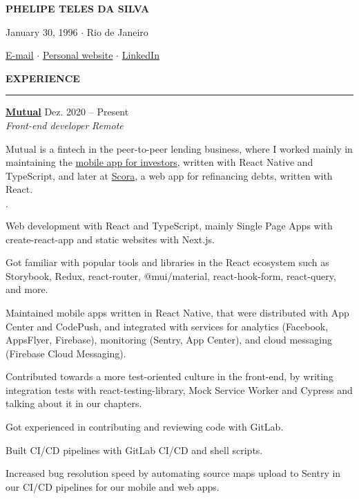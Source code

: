 \documentclass[12pt,letterpaper]{article}
\newenvironment{tightlist}
  {\begin{list}
    {$\cdot$}
    {
      \setlength{\leftmargin}{0em}
      \setlength{\itemsep}{-\smallskipamount}
    }
  }
{\end{list}}
\begin{document}
\pagestyle{empty}

\centerline{\huge\bf PHELIPE TELES DA SILVA}
\medskip

\centerline{January 30, 1996 $\cdot$ Rio de Janeiro}
\smallskip

\centerline{
  \href{mailto:telesphelipe@gmail.com}{E-mail}
  $\cdot$
  \href{https://phelipetls.github.io}{Personal website}
  $\cdot$
  \href{https://linkedin.com/in/phelipeteles}{LinkedIn}
}
\smallskip

\medskip \textbf{EXPERIENCE} \medskip
\hrule

\textbf{\href{https://mutual.club}{Mutual}} \hfill Dez. 2020 -- Present \\
\emph{Front-end developer} \hfill \emph{Remote} {\parfillskip=0pt\par}

Mutual is a fintech in the peer-to-peer lending business, where I worked mainly
in maintaining the \href{https://mutual.club/en/invest.html}{mobile app for
investors}, written with React Native and TypeScript, and later at
\href{https://scora.com.br/}{Scora}, a web app for refinancing debts, written
with React.

\medskip

\begin{tightlist}
  \item Web development with React and TypeScript, mainly Single Page Apps with
    create-react-app and static websites with Next.js.
  \item Got familiar with popular tools and libraries in the React ecosystem
    such as Storybook, Redux, react-router, @mui/material, react-hook-form,
    react-query, and more.
  \item Maintained mobile apps written in React Native, that were distributed
    with App Center and CodePush, and integrated with services for analytics
    (Facebook, AppsFlyer, Firebase), monitoring (Sentry, App Center), and cloud
    messaging (Firebase Cloud Messaging).
  \item Contributed towards a more test-oriented culture in the front-end, by
    writing integration tests with react-testing-library, Mock Service Worker
    and Cypress and talking about it in our chapters.
  \item Got experienced in contributing and reviewing code with GitLab.
  \item Built CI/CD pipelines with GitLab CI/CD and shell scripts.
  \item Increased bug resolution speed by automating source maps upload to
    Sentry in our CI/CD pipelines for our mobile and web apps.
\end{tightlist}
\end{document}
